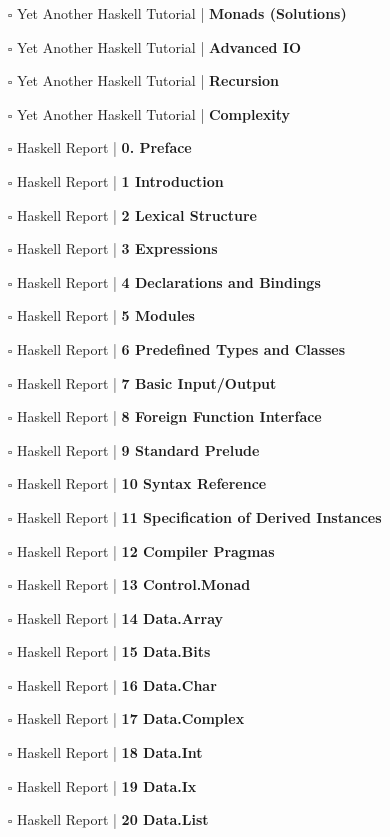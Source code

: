 \documentclass[a4, landscape, 12pt]{article}
\newcommand{\checkbox}{$\square$}%
\begin{document}
\begin{itemize}
{}
\item [\checkbox]  Yet Another Haskell Tutorial | \textbf{ Monads (Solutions)
}
\item [\checkbox]  Yet Another Haskell Tutorial | \textbf{ Advanced IO
}
\item [\checkbox]  Yet Another Haskell Tutorial | \textbf{ Recursion
}
\item [\checkbox]  Yet Another Haskell Tutorial | \textbf{ Complexity
}
\item [\checkbox]  Haskell Report | \textbf{ 0. Preface
}
\item [\checkbox]  Haskell Report | \textbf{ 1 Introduction
}
\item [\checkbox]  Haskell Report | \textbf{ 2 Lexical Structure
}
\item [\checkbox]  Haskell Report | \textbf{ 3 Expressions
}
\item [\checkbox]  Haskell Report | \textbf{ 4 Declarations and Bindings
}
\item [\checkbox]  Haskell Report | \textbf{ 5 Modules
}
\item [\checkbox]  Haskell Report | \textbf{ 6 Predefined Types and Classes
}
\item [\checkbox]  Haskell Report | \textbf{ 7 Basic Input/Output
}
\item [\checkbox]  Haskell Report | \textbf{ 8 Foreign Function Interface
}
\item [\checkbox]  Haskell Report | \textbf{ 9 Standard Prelude
}
\item [\checkbox]  Haskell Report | \textbf{ 10 Syntax Reference
}
\item [\checkbox]  Haskell Report | \textbf{ 11 Specification of Derived Instances
}
\item [\checkbox]  Haskell Report | \textbf{ 12 Compiler Pragmas
}
\item [\checkbox]  Haskell Report | \textbf{ 13 Control.Monad
}
\item [\checkbox]  Haskell Report | \textbf{ 14 Data.Array
}
\item [\checkbox]  Haskell Report | \textbf{ 15 Data.Bits
}
\item [\checkbox]  Haskell Report | \textbf{ 16 Data.Char
}
\item [\checkbox]  Haskell Report | \textbf{ 17 Data.Complex
}
\item [\checkbox]  Haskell Report | \textbf{ 18 Data.Int
}
\item [\checkbox]  Haskell Report | \textbf{ 19 Data.Ix
}
\item [\checkbox]  Haskell Report | \textbf{ 20 Data.List
}
\end{itemize}
\end{document}
